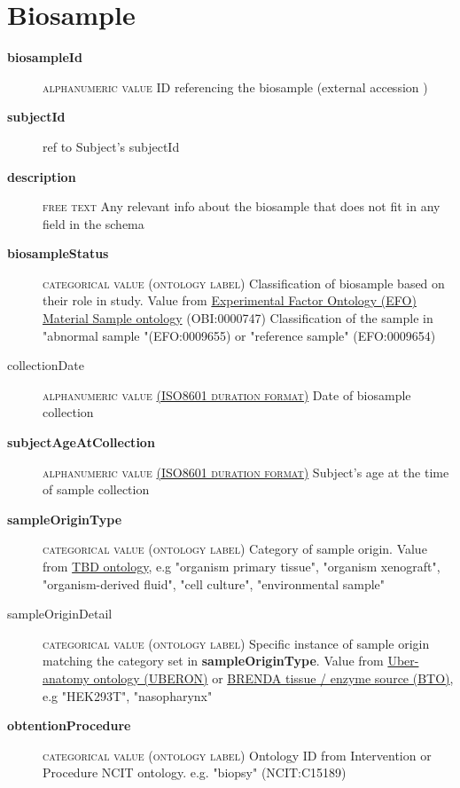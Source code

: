 \documentclass[a4paper, 10pt]{article}        %
\begin{document}
  
  \section*{ {\color{teal} Biosample}}
  
  \begin{description}
	\item[\textbf{biosampleId}]  {\textsc{alphanumeric value}} ID referencing the biosample (external accession )
	\item[\textbf{subjectId}] ref to Subject's subjectId
	\item[\textbf{description}]  {\textsc{free text}} Any relevant info about the biosample that does not fit in any field in the schema
	\item[\textbf{biosampleStatus}] {\textsc{categorical value (ontology label)}} Classification of biosample based on their role in study. Value from  \href{https://www.ebi.ac.uk/ols/ontologies/efo/terms?iri=http%3A%2F%2Fpurl.obolibrary.org%2Fobo%2FOBI_0000747&viewMode=All&siblings=false}{Experimental Factor Ontology (EFO) Material Sample ontology} (OBI:0000747) Classification of the sample in "abnormal sample "(EFO:0009655) or "reference sample" (EFO:0009654)
	\item[collectionDate] {\textsc{alphanumeric value \href{https://www.iso.org/iso-8601-date-and-time-format.html}{(ISO8601 duration format)}}} Date of biosample collection
	\item[\textbf{subjectAgeAtCollection}] {\textsc{alphanumeric value \href{https://www.iso.org/iso-8601-date-and-time-format.html}{(ISO8601 duration format)}}} Subject's age at  the time of sample collection
	\item[\textbf{sampleOriginType}] {\textsc{categorical value (ontology label)}} Category of sample origin. Value from \href{}{TBD ontology}, e.g "organism primary tissue", "organism xenograft", "organism-derived fluid", "cell culture", "environmental sample"
	\item[sampleOriginDetail] {\textsc{categorical value (ontology label)}} Specific instance of sample origin matching the category set in \textbf{sampleOriginType}. Value from \href{https://www.ebi.ac.uk/ols/ontologies/uberon}{Uber-anatomy ontology (UBERON)} or \href{https://www.ebi.ac.uk/ols/ontologies/bto}{BRENDA tissue / enzyme source (BTO)}, e.g "HEK293T", "nasopharynx"
	\item[\textbf{obtentionProcedure}] {\textsc{categorical value (ontology label)}} Ontology ID from Intervention or Procedure NCIT ontology. e.g. "biopsy" (NCIT:C15189) %

\end{description}
\end{document}
